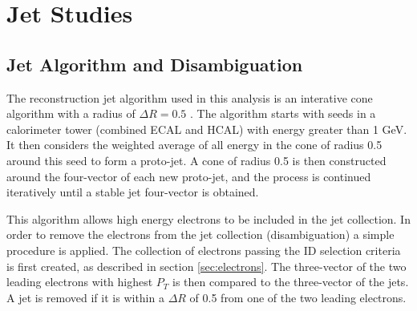 %
\section{Jet Studies} \label{sec:jet}

\subsection{Jet Algorithm and Disambiguation}

The reconstruction jet algorithm used in this analysis is an interative cone algorithm with a radius of $\Delta R=0.5$ \cite{JetAlg}.  
The algorithm starts with seeds in a calorimeter tower (combined ECAL and HCAL) with energy greater than 
1 GeV. It then considers the weighted average of all energy in the cone of radius 0.5 around this seed to form a proto-jet.  
A cone of radius 0.5 is then constructed around the four-vector of each new proto-jet,  
and the process is continued iteratively until a stable jet four-vector is obtained.

This algorithm allows high energy electrons to be included in the jet collection. 
In order to remove the electrons from the jet collection (disambiguation) a simple procedure is applied.  The collection 
of electrons passing the ID selection criteria is first created, as described in section \ref{sec:electrons}.  The three-vector of the 
two leading electrons with highest $P_{T}$ is then compared to the three-vector of the jets. 
A jet is removed if it is within a $\Delta R$ of 0.5 from one of the two leading electrons. 



